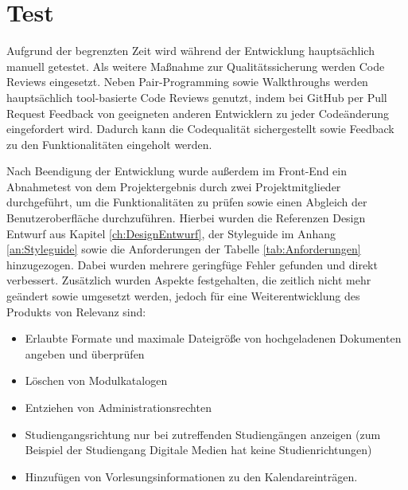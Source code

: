 \section{Test}
\label{ch:Test}
Aufgrund der begrenzten Zeit wird während der Entwicklung hauptsächlich manuell getestet. 
Als weitere Maßnahme zur Qualitätssicherung werden Code Reviews eingesetzt.
Neben Pair-Programming sowie Walkthroughs werden hauptsächlich tool-basierte Code Reviews genutzt, indem bei GitHub per Pull Request Feedback von geeigneten anderen Entwicklern zu jeder Codeänderung eingefordert wird.
Dadurch kann die Codequalität sichergestellt sowie Feedback zu den Funktionalitäten eingeholt werden.

Nach Beendigung der Entwicklung wurde außerdem im Front-End ein Abnahmetest von dem Projektergebnis durch zwei Projektmitglieder durchgeführt, um die Funktionalitäten zu prüfen sowie einen Abgleich der Benutzeroberfläche durchzuführen. 
Hierbei wurden die Referenzen Design Entwurf aus Kapitel \vref{ch:DesignEntwurf}, der Styleguide im Anhang \vref{an:Styleguide} sowie die Anforderungen der Tabelle \vref{tab:Anforderungen} hinzugezogen.
Dabei wurden mehrere geringfüge Fehler gefunden und direkt verbessert.
Zusätzlich wurden Aspekte festgehalten, die zeitlich nicht mehr geändert sowie umgesetzt werden, jedoch für eine Weiterentwicklung des Produkts von Relevanz sind: 

\begin{itemize}
    \item Erlaubte Formate und maximale Dateigröße von hochgeladenen Dokumenten angeben und überprüfen
    \item Löschen von Modulkatalogen 
    \item Entziehen von Administrationsrechten
    \item Studiengangsrichtung nur bei zutreffenden Studiengängen anzeigen (zum Beispiel der Studiengang Digitale Medien hat keine Studienrichtungen)
    \item Hinzufügen von Vorlesungsinformationen zu den Kalendareinträgen.
\end{itemize}
